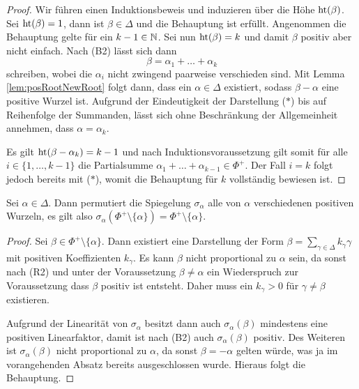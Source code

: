 \begin{proof}
  Wir führen einen Induktionsbeweis und induzieren über die Höhe $\operatorname{ht}(\beta)$.
  Sei $\operatorname{ht}(\beta) = 1$, dann ist $\beta \in \Delta$ und die Behauptung ist erfüllt.
  Angenommen die Behauptung gelte für ein $k-1 \in \mathbb{N}$.
  Sei nun $\operatorname{ht}(\beta) = k$ und damit $\beta$ positiv aber nicht einfach.
  Nach (B2) lässt sich dann 
  \begin{displaymath}
    \beta = \alpha_1 + \dots + \alpha_k \tag{$\ast$}
  \end{displaymath}
  schreiben, wobei die $\alpha_i$ nicht zwingend paarweise verschieden sind.
  Mit Lemma \ref{lem:posRootNewRoot} folgt dann, dass ein $\alpha \in \Delta$ existiert, sodass $\beta - \alpha$ eine positive Wurzel ist.
  Aufgrund der Eindeutigkeit der Darstellung ($\ast$) bis auf Reihenfolge der Summanden, lässt sich ohne Beschränkung der Allgemeinheit annehmen, dass $\alpha = \alpha_k$.

  Es gilt $\operatorname{ht}(\beta - \alpha_{k}) = k - 1$ und nach Induktionsvoraussetzung gilt 
  somit für alle $i \in \{1,\dots,k-1\}$ die Partialsumme $\alpha_1 + \dots + \alpha_{k-1} \in \Phi^+$.
  Der Fall $i = k$ folgt jedoch bereits mit ($\ast$), womit die Behauptung für $k$ vollständig bewiesen ist.
\end{proof}

\begin{lem}
  \label{lem:permute}
  Sei $\alpha \in \Delta$. 
  Dann permutiert die Spiegelung $\sigma_\alpha$ alle von $\alpha$ verschiedenen positiven Wurzeln, es gilt also $\sigma_\alpha(\Phi^+ \setminus \{\alpha\}) = \Phi^+ \setminus \{\alpha\}$.
\end{lem}

\begin{proof}
  Sei $\beta \in \Phi^+ \setminus \{\alpha\}$. 
  Dann existiert eine Darstellung der Form $\beta = \sum_{\gamma \in \Delta} k_\gamma \gamma$ mit positiven Koeffizienten $k_\gamma$.
  Es kann $\beta$ nicht proportional zu $\alpha$ sein, da sonst nach (R2) und unter der Voraussetzung $\beta \neq \alpha$ ein Wiederspruch zur Voraussetzung dass $\beta$ positiv ist entsteht.
  Daher muss ein $k_\gamma > 0$ für $\gamma \neq \beta$ existieren.

  Aufgrund der Linearität von $\sigma_\alpha$ besitzt dann auch $\sigma_\alpha(\beta)$ mindestens eine positiven Linearfaktor, damit ist nach (B2) auch $\sigma_\alpha(\beta)$ positiv.
  Des Weiteren ist $\sigma_\alpha(\beta)$ nicht proportional zu $\alpha$, da sonst $\beta = -\alpha$ gelten würde, was ja im vorangehenden Absatz bereits ausgeschlossen wurde.
  Hieraus folgt die Behauptung.
\end{proof}

